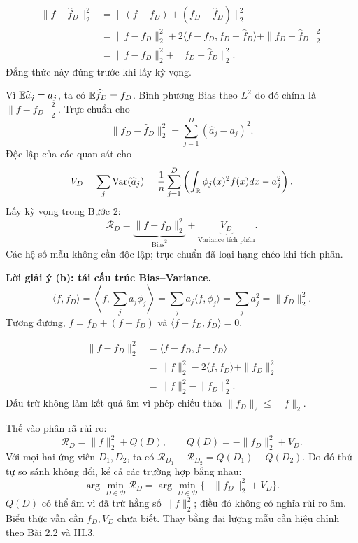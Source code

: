 \begin{align*}
\|f-\widehat f_D\|_2^2
&=\|(f-f_D)+(f_D-\widehat f_D)\|_2^2\\
&=\|f-f_D\|_2^2+2\langle f-f_D,f_D-\widehat f_D\rangle
+\|f_D-\widehat f_D\|_2^2\\
&=\|f-f_D\|_2^2+\|f_D-\widehat f_D\|_2^2.
\end{align*}
Đẳng thức này đúng trước khi lấy kỳ vọng.

Vì $\mathbb E\widehat a_j=a_j$, ta có $\mathbb E\widehat f_D=f_D$.
Bình phương Bias theo $L^2$ do đó chính là $\|f-f_D\|_2^2$.
Trực chuẩn cho
\[
\|f_D-\widehat f_D\|_2^2=\sum_{j=1}^D(\widehat a_j-a_j)^2.
\]
Độc lập của các quan sát cho
\[
V_D=\sum_j\operatorname{Var}(\widehat a_j)
=\frac1n\sum_{j=1}^D\left(\int_{\mathbb R}\phi_j(x)^2f(x)dx-a_j^2\right).
\]
Lấy kỳ vọng trong Bước 2:
\[
\boxed{\mathcal R_D=\underbrace{\|f-f_D\|_2^2}_{\text{Bias}^2}
+\underbrace{V_D}_{\text{Variance tích phân}}.}
\]
Các hệ số mẫu không cần độc lập; trực chuẩn đã loại hạng chéo khi tích phân.

\label{ot45:risk-reformulation}
\textbf{Lời giải ý (b): tái cấu trúc Bias--Variance.}
\[
\langle f,f_D\rangle
=\left\langle f,\sum_ja_j\phi_j\right\rangle
=\sum_ja_j\langle f,\phi_j\rangle
=\sum_ja_j^2=\|f_D\|_2^2.
\]
Tương đương, $f=f_D+(f-f_D)$ và $\langle f-f_D,f_D\rangle=0$.

\begin{align*}
\|f-f_D\|_2^2
&=\langle f-f_D,f-f_D\rangle\\
&=\|f\|_2^2-2\langle f,f_D\rangle+\|f_D\|_2^2\\
&=\boxed{\|f\|_2^2-\|f_D\|_2^2}.
\end{align*}
Dấu trừ không làm kết quả âm vì phép chiếu thỏa $\|f_D\|_2\leq\|f\|_2$.

Thế vào phân rã rủi ro:
\[
\mathcal R_D=\|f\|_2^2+Q(D),\qquad Q(D)=-\|f_D\|_2^2+V_D.
\]
Với mọi hai ứng viên $D_1,D_2$, ta có
$\mathcal R_{D_1}-\mathcal R_{D_2}=Q(D_1)-Q(D_2)$.
Do đó thứ tự so sánh không đổi, kể cả các trường hợp bằng nhau:
\[
\boxed{\arg\min_{D\in\mathcal D}\mathcal R_D
=\arg\min_{D\in\mathcal D}\{-\|f_D\|_2^2+V_D\}.}
\]
$Q(D)$ có thể âm vì đã trừ hằng số $\|f\|_2^2$; điều đó không có nghĩa rủi ro âm.
Biểu thức vẫn cần $f_D,V_D$ chưa biết. Thay bằng đại lượng mẫu cần hiệu chỉnh
theo Bài \hyperref[ot45:contrast]{2.2} và \hyperref[ot45:oracle]{III.3}.

